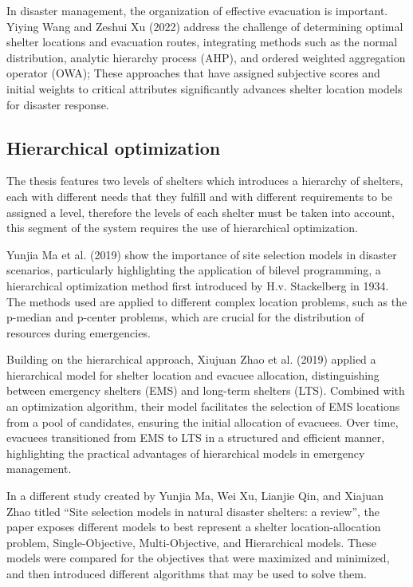 In disaster management, the organization of effective evacuation is important. Yiying Wang and Zeshui Xu (2022) address the challenge of determining optimal shelter locations and evacuation routes, integrating methods such as the normal distribution, analytic hierarchy process (AHP), and ordered weighted aggregation operator (OWA); These approaches that have assigned subjective scores and initial weights to critical attributes significantly advances shelter location models for disaster response. \parencite{Yiying2022}

\subsection{Hierarchical optimization}

The thesis features two levels of shelters which introduces a hierarchy of shelters, each with different needs that they fulfill and with different requirements to be assigned a level, therefore the levels of each shelter must be taken into account, this segment of the system requires the use of hierarchical optimization.

Yunjia Ma et al. (2019) show the importance of site selection models in disaster scenarios, particularly highlighting the application of bilevel programming, a hierarchical optimization method first introduced by H.v. Stackelberg in 1934. The methods used are applied to different complex location problems, such as the p-median and p-center problems, which are crucial for the distribution of resources during emergencies. \parencite{Yunjia2019}

Building on the hierarchical approach, Xiujuan Zhao et al. (2019) applied a hierarchical model for shelter location and evacuee allocation, distinguishing between emergency shelters (EMS) and long-term shelters (LTS). Combined with an optimization algorithm, their model facilitates the selection of EMS locations from a pool of candidates, ensuring the initial allocation of evacuees. Over time, evacuees transitioned from EMS to LTS in a structured and efficient manner, highlighting the practical advantages of hierarchical models in emergency management. \parencite{Xiujuan2019}

In a different study created by Yunjia Ma, Wei Xu, Lianjie Qin, and Xiajuan Zhao titled “Site selection models in natural disaster shelters: a review”, the paper exposes different models to best represent a shelter location-allocation problem, Single-Objective, Multi-Objective, and Hierarchical models. These models were compared for the objectives that were maximized and minimized, and then introduced different algorithms that may be used to solve them. \parencite{Yunjia2019}

